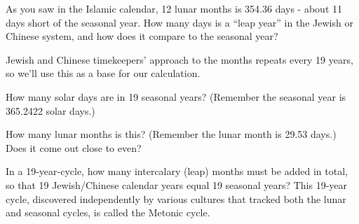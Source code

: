 \documentclass[11pt]{article}
\begin{document}
As you saw in the Islamic calendar, 12 lunar months is 354.36 days - about 11 days short of the seasonal year. How many days is a ``leap year'' in the Jewish or Chinese system, and how does it compare to the seasonal year?

\vspace{1in}
\underline{\hspace{6in}}


Jewish and Chinese timekeepers' approach to the months repeats every 19 years, so we'll use this as a base for our calculation. 

\bigskip

\begin{minipage}{0.45\textwidth}
	How many solar days are in 19 seasonal years? (Remember the seasonal year is 365.2422 solar days.)
	
	\vspace{1in}
	
	\underline{\hspace{3in}}
\end{minipage}
\hspace{0.1\textwidth}
\begin{minipage}{0.45\textwidth}
	How many lunar months is this? (Remember the lunar month is 29.53 days.) Does it come out close to even?
	
	\vspace{1in}
	
	\underline{\hspace{3in}}
\end{minipage}

In a 19-year-cycle, how many intercalary (leap) months must be added in total, so that 19 Jewish/Chinese calendar years equal 19 seasonal years? This 19-year cycle, discovered independently by various cultures that tracked both the lunar and seasonal cycles, is called the Metonic cycle.

\vspace{1in}
\underline{\hspace{6in}}
\end{document}
